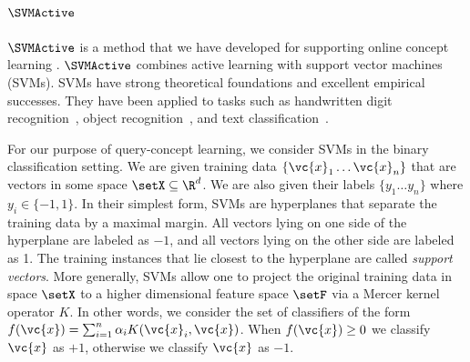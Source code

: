 \paragraph{$\SVMActive$}
\label{sec-svm}

$\SVMActive$ is 
a method that we have developed
for supporting online concept learning \cite{SVM01}.
$\SVMActive$ combines active learning with
support vector machines (SVMs).
SVMs have strong theoretical foundations and excellent empirical
successes. They have been applied to tasks such as handwritten digit
recognition~\cite{Vapnik:1998}, object
recognition~\cite{Papageorgiou+al:98}, and text
classification~\cite{Joachims:ECML97}.
%

For our purpose of query-concept learning, we
consider SVMs in the binary classification setting. We are
given training data $\{ \vc{x}_1 \ldots \vc{x}_n \}$ that are vectors
in some space $\setX \subseteq \R^d$. We are also given their
labels $\{ y_1 \ldots y_n \}$ where $y_i \in \{ -1,1 \}$. In their
simplest form, SVMs are hyperplanes that separate the training data by
a maximal margin. All vectors lying on
one side of the hyperplane are labeled as $-1$, and all vectors lying
on the other side are labeled as 1. The training instances that lie
closest to the hyperplane are called {\em support vectors}. More
generally, SVMs allow one to project the original training data in
space $\setX$ to a higher dimensional feature space $\setF$ via a
Mercer kernel operator $K$. In other words, we consider the set of
classifiers of the form $f(\vc{x}) = \sum_{i=1}^n
\alpha_i K(\vc{x}_i, \vc{x})$. When $f(\vc{x}) \ge 0$ we classify $\vc{x}$ as
$+1$, otherwise we classify $\vc{x}$ as $-1$.


